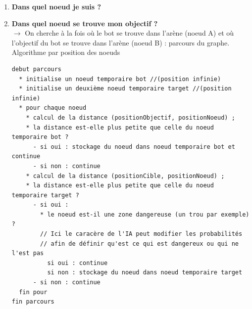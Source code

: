 \begin{enumerate}
	\item \textbf{Dans quel noeud je suis ?}
	\item \textbf{Dans quel noeud se trouve mon objectif ?}\\
$\rightarrow$ On cherche à la fois où le bot se trouve dans l’arène (noeud A) et où l'objectif du bot se trouve dans l’arène (noeud B) : parcours du graphe.\\

Algorithme par position des noeuds
\begin{footnotesize}
\setlength{\itemsep}{20pt}
\begin{verbatim}
debut parcours
  * initialise un noeud temporaire bot //(position infinie)
  * initialise un deuxième noeud temporaire target //(position infinie)
  * pour chaque noeud
    * calcul de la distance (positionObjectif, positionNoeud) ;
    * la distance est-elle plus petite que celle du noeud temporaire bot ?
      - si oui : stockage du noeud dans noeud temporaire bot et continue
      - si non : continue
    * calcul de la distance (positionCible, positionNoeud) ;
    * la distance est-elle plus petite que celle du noeud temporaire target ?
      - si oui : 
        * le noeud est-il une zone dangereuse (un trou par exemple) ?
        // Ici le caracère de l'IA peut modifier les probabilités
        // afin de définir qu'est ce qui est dangereux ou qui ne l'est pas
          si oui : continue
          si non : stockage du noeud dans noeud temporaire target
      - si non : continue
  fin pour
fin parcours
\end{verbatim}
\end{footnotesize}


\end{enumerate}
